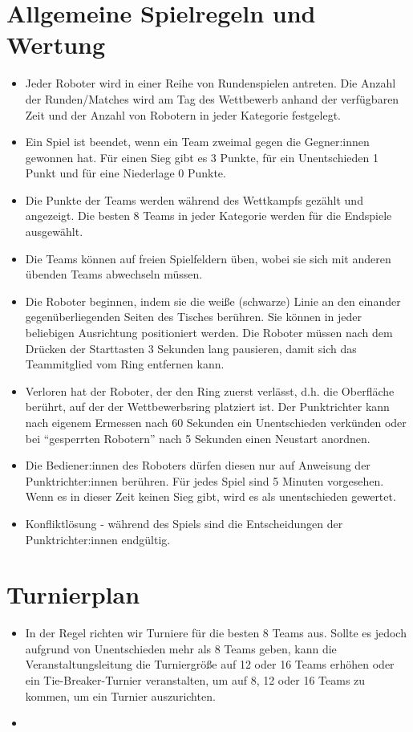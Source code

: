 \documentclass[a4paper,12pt]{article}
\begin{document}
\section{Allgemeine Spielregeln und Wertung}
\begin{itemize}
	\item Jeder Roboter wird in einer Reihe von Rundenspielen antreten. Die
		Anzahl der Runden/Matches wird am Tag des Wettbewerb anhand der
		verfügbaren Zeit und der Anzahl von Robotern in jeder Kategorie
		festgelegt.
	\item Ein Spiel ist beendet, wenn ein Team zweimal gegen die
		Gegner:innen gewonnen hat. Für einen Sieg gibt es 3 Punkte, für
		ein Unentschieden 1 Punkt und für eine Niederlage 0 Punkte.
	\item Die Punkte der Teams werden während des Wettkampfs gezählt und
		angezeigt. Die besten 8 Teams in jeder Kategorie werden für die
		Endspiele ausgewählt.
	\item Die Teams können auf freien Spielfeldern üben, wobei sie sich mit
		anderen übenden Teams abwechseln müssen.
	\item Die Roboter beginnen, indem sie die weiße (schwarze) Linie an den
		einander gegenüberliegenden Seiten des Tisches berühren. Sie
		können in jeder beliebigen Ausrichtung positioniert werden. Die
		Roboter müssen nach dem Drücken der Starttasten 3 Sekunden lang
		pausieren, damit sich das Teammitglied vom Ring entfernen kann.
	\item Verloren hat der Roboter, der den Ring zuerst verlässt, d.h. die
		Oberfläche berührt, auf der der Wettbewerbsring platziert ist.
		Der Punktrichter kann nach eigenem Ermessen nach 60 Sekunden
		ein Unentschieden verkünden oder bei "`gesperrten Robotern"'
		nach 5 Sekunden einen Neustart anordnen.
	\item Die Bediener:innen des Roboters dürfen diesen nur auf Anweisung
		der Punktrichter:innen berühren. Für jedes Spiel sind 5 Minuten
		vorgesehen. Wenn es in dieser Zeit keinen Sieg gibt, wird es
		als unentschieden gewertet.
	\item Konfliktlösung - während des Spiels sind die Entscheidungen der
		Punktrichter:innen endgültig.
\end{itemize}

\pagebreak
\section{Turnierplan}
\begin{itemize}
	\item In der Regel richten wir Turniere für die besten 8 Teams aus.
		Sollte es jedoch aufgrund von Unentschieden mehr als 8 Teams
		geben, kann die Veranstaltungsleitung die Turniergröße auf 12
		oder 16 Teams erhöhen oder ein Tie-Breaker-Turnier
		veranstalten, um auf 8, 12 oder 16 Teams zu kommen, um ein
		Turnier auszurichten.
        \item \tournamentQualification
\end{itemize}
\tournamentScoring
\end{document}
